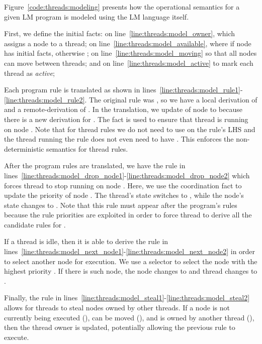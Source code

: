 Figure~\ref{code:threads:modeling} presents how the operational semantics for a
given LM program is modeled using the LM language itself.

First, we define the initial facts:  on
line~\ref{line:threads:model_owner}, which assigns a node to a thread;
 on line~\ref{line:threads:model_available}, where
 if node  has initial facts, otherwise ;
 on line~\ref{line:threads:model_moving} so that all nodes
can move between threads; and  on
line~\ref{line:threads:model_active} to mark each thread as \emph{active};

Each program rule is translated as shown in
lines~\ref{line:threads:model_rule1}-\ref{line:threads:model_rule2}. The
original rule was , so we have a local derivation of  and a
remote-derivation of . In the translation, we update
 of node  to  because there is a new
derivation for . The fact  is used to ensure that
thread  is running on node . Note that for thread rules we do
not need to use  on the rule's LHS and the thread running
the rule does not even need to have . This enforces the
non-deterministic semantics for thread rules.

After the program rules are translated, we have the rule in
lines~\ref{line:threads:model_drop_node1}-\ref{line:threads:model_drop_node2}
which forces thread  to stop running on node . Here, we use the
coordination fact  to update the priority of node
. The thread's state switches to , while the node's state
changes to . Note that this rule must appear after the
program's rules because the rule priorities are exploited in order to force
thread  to derive all the candidate rules for .

If a thread is idle, then it is able to derive the rule in
lines~\ref{line:threads:model_next_node1}-\ref{line:threads:model_next_node2} in
order to select another node for execution. We use a  selector to
select the node  with the highest priority . If there is such
node, the node changes to  and thread  changes to
.

Finally, the rule in
lines~\ref{line:threads:model_steal1}-\ref{line:threads:model_steal2} allows for
threads to steal nodes owned by other threads. If a node is not currently being
executed (), can be moved (), and is owned by
another thread (), then the thread owner is
updated, potentially allowing the previous rule to execute.

